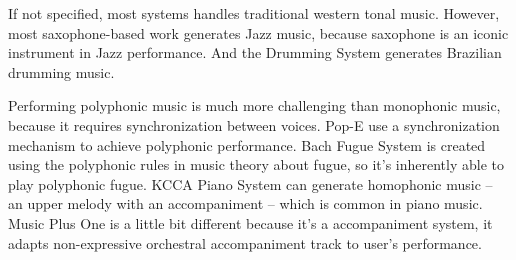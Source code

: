 If not specified, most systems handles traditional western tonal music. However, most saxophone-based work \cite{40, 41, 42} generates Jazz music, because saxophone is an iconic instrument in Jazz performance. And the Drumming System \cite{56} generates Brazilian drumming music.%

Performing polyphonic music is much more challenging than monophonic music, because it requires synchronization between voices. Pop-E \cite{28} use a synchronization mechanism to achieve polyphonic performance. Bach Fugue System \cite{23} is created using the polyphonic rules in music theory about fugue, so it's inherently able to play polyphonic fugue. KCCA Piano System \cite{57} can generate homophonic music -- an upper melody with an accompaniment -- which is common in piano music.  Music Plus One \cite{52,53,54} is a little bit different because it's a accompaniment system, it adapts non-expressive orchestral accompaniment track to user's performance. %

